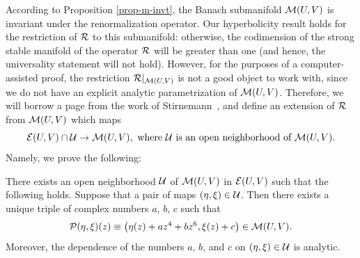 According to Proposition \ref{prop-m-invt}, the Banach  submanifold $\mathcal{M}(U,V)$ is invariant under the renormalization operator. Our hyperbolicity result
holds for the restriction of $\mathcal{R}$ to this submanifold: otherwise, the codimension of the strong stable manifold of the operator $\mathcal{R}$ will be greater than one (and hence, the universality statement will not hold). However, for the purposes of a computer-assisted proof, the restriction
$\mathcal{R}|_{\mathcal{M}(U,V)}$ is not a good object to work with, since we do not have an explicit analytic parametrization of $\mathcal{M}(U,V)$.
Therefore, we will borrow a page from the work of Stirnemann~\cite{Stir}, and define an extension of $\mathcal{R}$ from $\mathcal{M}(U,V)$ which maps
$$\mathcal{E}(U,V)\cap \mathcal{U}\to\mathcal{M}(U,V), \text{ where }\mathcal{U} \text{ is an open neighborhood of }\mathcal{M}(U,V).$$
Namely, we prove the following:
\begin{prop}
\label{prop-proj}
There exists an open neighborhood $\mathcal{U}$ of $\mathcal{M}(U,V)$ in $\mathcal{E}(U,V)$ such that the following holds.
Suppose that a pair of maps $(\eta,\xi) \in \mathcal{U}$. Then there exists a unique triple of complex numbers $a$, $b$, $c$ such that 
\begin{eqnarray}
\label{Pproj}
\mathcal{P} (\eta,\xi)(z)\equiv\left( \eta(z)+a z^4+b z^6, \xi(z)+c \right)\in\mathcal{M}(U,V).
\end{eqnarray}
Moreover, the dependence of the numbers $a$, $b$, and $c$ on $(\eta,\xi)\in\mathcal{U}$ is analytic.
\end{prop}
